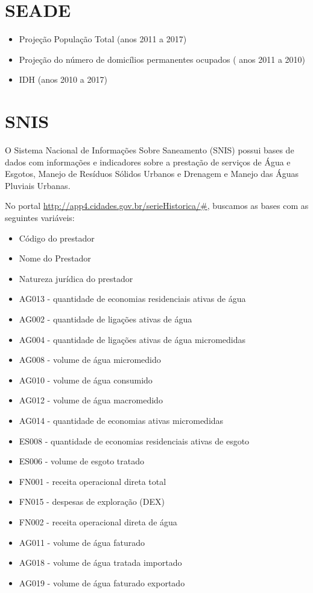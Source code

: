 \documentclass[]{book}
\providecommand{\tightlist}{%
  \setlength{\itemsep}{0pt}\setlength{\parskip}{0pt}}
\begin{document}
\hypertarget{seade}{%
\section{SEADE}\label{seade}}

\begin{itemize}
\tightlist
\item
  Projeção População Total (anos 2011 a 2017)
\item
  Projeção do número de domicílios permanentes ocupados ( anos 2011 a 2010)
\item
  IDH (anos 2010 a 2017)
\end{itemize}

\hypertarget{snis}{%
\section{SNIS}\label{snis}}

O Sistema Nacional de Informações Sobre Saneamento (SNIS) possui bases de dados com informações e indicadores sobre a prestação de serviços de Água e Esgotos, Manejo de Resíduos Sólidos Urbanos e Drenagem e Manejo das Águas Pluviais Urbanas.

No portal \url{http://app4.cidades.gov.br/serieHistorica/\#}, buscamos as bases com as seguintes variáveis:

\begin{itemize}
\tightlist
\item
  Código do prestador
\item
  Nome do Prestador
\item
  Natureza jurídica do prestador
\item
  AG013 - quantidade de economias residenciais ativas de água
\item
  AG002 - quantidade de ligações ativas de água
\item
  AG004 - quantidade de ligações ativas de água micromedidas
\item
  AG008 - volume de água micromedido
\item
  AG010 - volume de água consumido
\item
  AG012 - volume de água macromedido
\item
  AG014 - quantidade de economias ativas micromedidas
\item
  ES008 - quantidade de economias residenciais ativas de esgoto
\item
  ES006 - volume de esgoto tratado
\item
  FN001 - receita operacional direta total
\item
  FN015 - despesas de exploração (DEX)
\item
  FN002 - receita operacional direta de água
\item
  AG011 - volume de água faturado
\item
  AG018 - volume de água tratada importado
\item
  AG019 - volume de água faturado exportado
\end{itemize}
\end{document}
